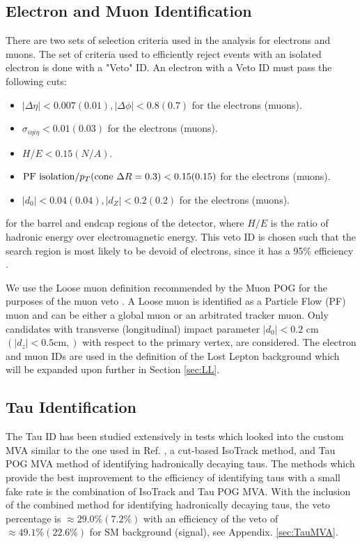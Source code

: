  \subsection{Electron and Muon Identification}\label{EleMuonID}
 There are two sets of selection criteria used in the analysis for electrons and muons. The set of criteria used to efficiently reject events with an isolated electron is done with a "Veto" ID. An electron with a Veto ID must pass the following cuts:
 \begin{itemize}
	 \item $|\Delta\eta|<0.007(0.01),|\Delta\phi|<0.8(0.7)$ for the electrons (muons).
	 \item $\sigma_{i\eta i\eta}<0.01(0.03)$ for the electrons (muons).
	 \item $H/E<0.15(N/A)$.
	 \item $\text{PF isolation}/p_{T}(\text{cone } \Delta R=0.3)<0.15(0.15)$ for the electrons (muons).
	 \item $|d_{0}|<0.04(0.04),|d_Z|<0.2(0.2)$ for the electrons (muons).
 \end{itemize}
 for the barrel and endcap regions of the detector, where $H/E$ is the ratio of hadronic energy over electromagnetic energy. This veto ID is chosen such that the search region is most likely to be devoid of electrons, since it has a 95\% efficiency \cite{noauthor_https://twiki.cern.ch/twiki/bin/view/cms/cutbasedelectronidentificationrun2_nodate}.
 
 We use the Loose muon definition recommended by the Muon POG for the purposes of the muon veto \cite{noauthor_https://twiki.cern.ch/twiki/bin/view/cmspublic/swguidemuonidloose_muon_nodate}. A Loose muon is identified as a Particle Flow (PF)\cite{noauthor_cms_nodate} muon and can be either a global muon or an arbitrated tracker muon. Only candidates with transverse (longitudinal) impact parameter $|d_0|<0.2$ cm $(|d_z|<0.5 \text{cm},)$ with respect to the primary vertex, are considered. The electron and muon IDs are used in the definition of the Lost Lepton background which will be expanded upon further in Section \ref{sec:LL}. 
 
\subsection{Tau Identification}\label{TauID}
The Tau ID has been studied extensively in tests which looked into the custom MVA \cite{roe_boosted_2004, hoecker_tmva_2007, bravo_search_2015} similar to the one used in Ref. \cite{cms_collaboration_search_2016}, a cut-based IsoTrack method, and Tau POG MVA method of identifying hadronically decaying taus. The methods which provide the best improvement to the efficiency of identifying taus with a small fake rate is the combination of IsoTrack and Tau POG MVA. With the inclusion of the combined method for identifying hadronically decaying taus, the veto percentage is $\approx29.0\%(7.2\%)$ with an efficiency of the veto of $\approx49.1\%(22.6\%)$ for SM background (signal), see Appendix. \ref{sec:TauMVA}. 

